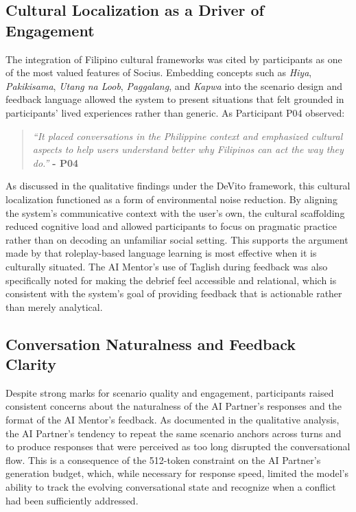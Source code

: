\subsection{Cultural Localization as a Driver of Engagement}
\indent The integration of Filipino cultural frameworks was cited by 
participants as one of the most valued features of Socius. Embedding 
concepts such as \textit{Hiya}, \textit{Pakikisama}, \textit{Utang na 
Loob}, \textit{Paggalang}, and \textit{Kapwa} into the scenario design and 
feedback language allowed the system to present situations that felt 
grounded in participants' lived experiences rather than generic. As 
Participant P04 observed:

\begin{quote}
\textit{``It placed conversations in the Philippine context and emphasized 
cultural aspects to help users understand better why Filipinos can act the 
way they do.''} \textbf{- P04}
\end{quote}

\noindent As discussed in the qualitative findings under the DeVito 
framework, this cultural localization functioned as a form of environmental 
noise reduction. By aligning the system's communicative context with the 
user's own, the cultural scaffolding reduced cognitive load and allowed 
participants to focus on pragmatic practice rather than on decoding an 
unfamiliar social setting. This supports the argument made by 
 that roleplay-based language learning is most 
effective when it is culturally situated. The AI Mentor's use of Taglish 
during feedback was also specifically noted for making the debrief feel 
accessible and relational, which is consistent with the system's goal of 
providing feedback that is actionable rather than merely analytical.

\subsection{Conversation Naturalness and Feedback Clarity}
\indent Despite strong marks for scenario quality and engagement, 
participants raised consistent concerns about the naturalness of the AI 
Partner's responses and the format of the AI Mentor's feedback. As 
documented in the qualitative analysis, the AI Partner's tendency to repeat 
the same scenario anchors across turns and to produce responses that were 
perceived as too long disrupted the conversational flow. This is a 
consequence of the 512-token constraint on the AI Partner's generation 
budget, which, while necessary for response speed, limited the model's 
ability to track the evolving conversational state and recognize when a 
conflict had been sufficiently addressed.

